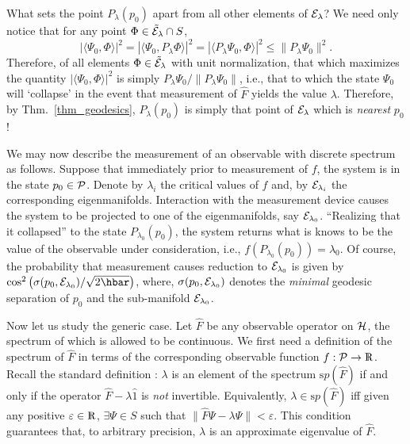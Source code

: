 \documentclass[12pt,aps,eqsecnum,tighten]{revtex4-2}
\def\be{\begin{equation}}
\def\ee{\end{equation}}
\def\<{\langle}
\def\>{\rangle}
\def\H{{\cal H}}
\def\P{{\cal P}}
\def\Bbb{}
\def\Rl{{\mathchoice 
{\setbox0=\hbox{$\displaystyle\rm R$}\hbox{\hbox to0pt
{\kern0.4\wd0\vrule height0.9\ht0\hss}\box0}}
{\setbox0=\hbox{$\textstyle\rm R$}\hbox{\hbox to0pt
{\kern0.4\wd0\vrule height0.9\ht0\hss}\box0}}
{\setbox0=\hbox{$\scriptstyle\rm R$}\hbox{\hbox to0pt
{\kern0.4\wd0\vrule height0.9\ht0\hss}\box0}}
{\setbox0=\hbox{$\scriptscriptstyle\rm R$}\hbox{\hbox to0pt
{\kern0.4\wd0\vrule height0.9\ht0\hss}\box0}}}}
\def\Rl{{\mathchoice
{\setbox0=\hbox{$\displaystyle\rm R$}\hbox{\hbox to0pt
{\kern0.4\wd0\vrule height0.9\ht0\hss}\box0}}
{\setbox0=\hbox{$\textstyle\rm R$}\hbox{\hbox to0pt
{\kern0.4\wd0\vrule height0.9\ht0\hss}\box0}}
{\setbox0=\hbox{$\scriptstyle\rm R$}\hbox{\hbox to0pt
{\kern0.4\wd0\vrule height0.9\ht0\hss}\box0}}
{\setbox0=\hbox{$\scriptscriptstyle\rm R$}\hbox{\hbox to0pt
{\kern0.4\wd0\vrule height0.9\ht0\hss}\box0}}}}
\def\R{\Rl}
\begin{document}
What sets the point ${\Bbb P}_\lambda(p_0)$ apart from all other
elements of  ${\cal E}_\lambda$?  We need only notice that for any
point  $\Phi \in \tilde{\cal E}_\lambda \cap S$,
%
\be\label{projection-ineq}
\left| \< \Psi_0, \Phi \> \right|^2 =
\left| \< \Psi_0, {\Bbb P}_\lambda \Phi \> \right|^2 =
\left| \< {\Bbb P}_\lambda \Psi_0, \Phi \> \right|^2 \le
\| {\Bbb P}_\lambda \Psi_0 \|^2.
\ee
%
Therefore, of all elements $\Phi \in \tilde{\cal E}_\lambda$ with unit
normalization, that which maximizes the quantity $|\<
\Psi_0,\Phi\>|^2$ is simply ${\Bbb P}_\lambda \Psi_0 / \| {\Bbb
P}_\lambda \Psi_0 \|$, i.e., that to which the state $\Psi_0$ will
`collapse' in the event that measurement of $\hat{F}$ yields the value
$\lambda$.  Therefore, by Thm.~\ref{thm_geodesics}, ${\Bbb
P}_\lambda(p_0)$ is simply that point of ${\cal E}_\lambda$ which is
{\em nearest} $p_0$!

We may now describe the measurement of an observable with discrete
spectrum as follows.  Suppose that immediately prior to measurement of
$f$, the system is in the state $p_0 \in \P$.  Denote by $\lambda_i$
the critical values of $f$ and, by ${\cal E}_{\lambda_i}$ the
corresponding eigenmanifolds.  Interaction with the measurement device
causes the system to be projected to one of the eigenmanifolds, say
${\cal E}_{\lambda_0}$.  ``Realizing that it collapsed'' to the state
${\Bbb P}_{\lambda_0}(p_0)$, the system returns what is knows to be
the value of the observable under consideration, i.e., $f\left( {\Bbb
P}_{\lambda_0}(p_0)\right) = \lambda_0$.  Of course, the probability
that measurement causes reduction to ${\cal E}_{\lambda_0}$ is given
by $\cos^2 \left( \sigma(p_0,{\cal E}_{\lambda_0}) / \sqrt{2\hbar}
\right)$, where, $\sigma(p_0,{\cal E}_{\lambda_0})$ denotes the {\em
minimal} geodesic separation of $p_0$ and the sub-manifold ${\cal
E}_{\lambda_0}$.

Now let us study the generic case.  Let $\hat{F}$ be any observable
operator on $\H$, the spectrum of which is allowed to be continuous.
We first need a definition of the spectrum of $\hat{F}$ in terms of
the corresponding observable function $f:\P\rightarrow\R$.  Recall the
standard definition \cite{reed-simon}: $\lambda$ is an element of the
spectrum ${\mathrm sp}(\hat{F})$ if and only if the operator $\hat{F}
- \lambda\hat{1}$ is {\em not} invertible.  Equivalently, $\lambda \in
{\mathrm sp}(\hat{F})$ iff given any positive $\varepsilon\in\R$,
$\exists \Psi\in S$ such that $\| \hat{F}\Psi - \lambda\Psi \| <
\varepsilon$.  This condition guarantees that, to arbitrary precision,
$\lambda$ is an approximate eigenvalue of $\hat{F}$.
\end{document}
